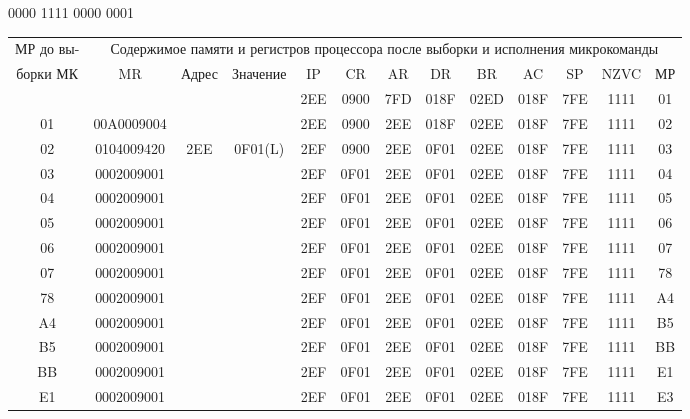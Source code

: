 0000 1111 0000 0001
\small{
\begin{flushleft}
    \begin{tabular}{|c|c|c|c|c|c|c|c|c|c|c|c|c|}
        \hline
        МР до вы- & \multicolumn{12}{1}{Содержимое памяти и регистров процессора после выборки и исполнения микрокоманды} \\
        \cline{2-13}
        борки МК & MR         & Адрес & Значение & IP  & CR   & AR  & DR   & BR   & AC   & SP  & NZVC & МР \\
        \hline
        &            &       &          & 2EE & 0900 & 7FD & 018F & 02ED & 018F & 7FE & 1111 & 01 \\
        \hline
        01       & 00A0009004 &       &          & 2EE & 0900 & 2EE & 018F & 02EE & 018F & 7FE & 1111 & 02 \\
        \hline
        02       & 0104009420 & 2EE   & 0F01(L)  & 2EF & 0900 & 2EE & 0F01 & 02EE & 018F & 7FE & 1111 & 03 \\
        \hline
        03       & 0002009001 &       &          & 2EF & 0F01 & 2EE & 0F01 & 02EE & 018F & 7FE & 1111 & 04 \\
        \hline
        04       & 0002009001 &       &          & 2EF & 0F01 & 2EE & 0F01 & 02EE & 018F & 7FE & 1111 & 05 \\
        \hline
        05       & 0002009001 &       &          & 2EF & 0F01 & 2EE & 0F01 & 02EE & 018F & 7FE & 1111 & 06 \\
        \hline
        06       & 0002009001 &       &          & 2EF & 0F01 & 2EE & 0F01 & 02EE & 018F & 7FE & 1111 & 07 \\
        \hline
        07       & 0002009001 &       &          & 2EF & 0F01 & 2EE & 0F01 & 02EE & 018F & 7FE & 1111 & 78 \\
        \hline
        78       & 0002009001 &       &          & 2EF & 0F01 & 2EE & 0F01 & 02EE & 018F & 7FE & 1111 & A4 \\
        \hline
        A4       & 0002009001 &       &          & 2EF & 0F01 & 2EE & 0F01 & 02EE & 018F & 7FE & 1111 & B5 \\
        \hline
        B5       & 0002009001 &       &          & 2EF & 0F01 & 2EE & 0F01 & 02EE & 018F & 7FE & 1111 & BB \\
        \hline
        BB       & 0002009001 &       &          & 2EF & 0F01 & 2EE & 0F01 & 02EE & 018F & 7FE & 1111 & E1 \\
        \hline
        E1       & 0002009001 &       &          & 2EF & 0F01 & 2EE & 0F01 & 02EE & 018F & 7FE & 1111 & E3 \\

\end{tabular}
\end{flushleft}}
